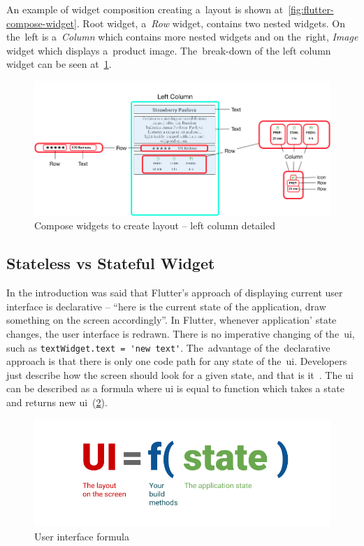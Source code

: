 An example of widget composition creating a~layout is shown at~\cref{fig:flutter-compose-widget}. Root widget, a~\textit{Row} widget, contains two nested widgets. On the~left is a~\textit{Column} which contains more nested widgets and on the~right, \textit{Image} widget which displays a~product image. The~break-down of the left column widget can be seen at~\cref{fig:flutter-compose-widget-detail}. 

\begin{figure}[htp]
    \centering
    \includegraphics[width=0.75\linewidth]{img/flutter/layout_compose_detail.png}
    \caption{Compose widgets to create layout -- left column detailed~\cite{flutter-widget-layout}}
    \label{fig:flutter-compose-widget-detail}
\end{figure}
\subsection{Stateless vs Stateful Widget}
In the introduction was said that Flutter's approach of displaying current user interface is declarative -- ``here is the current state of the application, draw something on the screen accordingly''.  In Flutter, whenever application' state changes, the user interface is redrawn. There is no imperative changing of the~\gls{ui}, such as \verb|textWidget.text = 'new text'|. The~advantage of the~declarative approach is that there is only one code path for any state of the~\gls{ui}. Developers just describe how the screen should look for a given state, and that is it~\cite{flutter-declarative}. The \gls{ui} can be described as a formula where \gls{ui} is equal to function which takes a state and returns new \gls{ui}~(\cref{fig:flutter-ui-formula}).

\begin{figure}[htp]
    \centering
    \includegraphics[width=0.6\linewidth]{img/flutter/ui_f_state.png}
    \caption{User interface formula~\cite{flutter-declarative}}
    \label{fig:flutter-ui-formula}
\end{figure}
